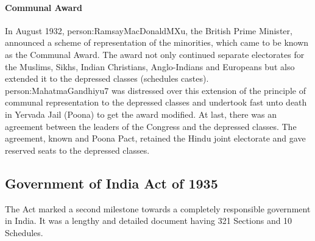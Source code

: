 \paragraph{Communal Award}
In August 1932, \gls{person:RamsayMacDonaldMXu}, the British Prime Minister, announced a scheme of representation of the minorities, which came to be known as the Communal Award. The award not only continued separate electorates for the Muslims, Sikhs, Indian Christians, Anglo-Indians and Europeans but also extended it to the depressed classes (schedules castes). \gls{person:MahatmaGandhiyu7} was distressed over this extension of the principle of communal representation to the depressed classes and undertook fast unto death in Yervada Jail (Poona) to get the award modified. At last, there was an agreement between the leaders of the Congress and the depressed classes. The agreement, known and Poona Pact, retained the Hindu joint electorate and gave reserved seats to the depressed classes.



\subsection{Government of India Act of 1935}

The Act marked a second milestone towards a completely responsible government in India. It was a lengthy and detailed document having 321 Sections and 10 Schedules.

